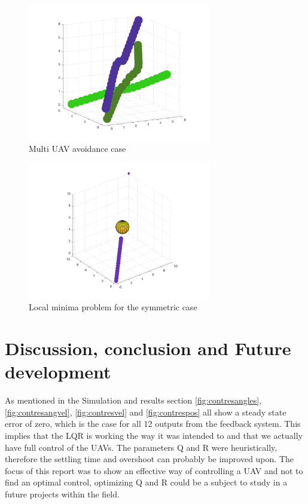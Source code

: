 \documentclass[journal]{IEEEtran}
\begin{document}
		\begin{figure}[H]
			\centering
			\includegraphics[width=8cm]{Results/Potentialfields/multi_uav_avoidance}
			\caption{Multi UAV avoidance case}
			\label{fig:multi_uav_avoidance}
		\end{figure}

		\begin{figure}[H]
			\centering
			\includegraphics[width=8cm]{Results/Potentialfields/localminima}
			\caption{Local minima problem for the symmetric case}
			\label{fig:localminima}
		\end{figure}
		
	\section{Discussion, conclusion and Future development}
	As mentioned in the Simulation and results section \figurename{\ref{fig:contresangles}}, \figurename{\ref{fig:contresangvel}}, \figurename{\ref{fig:contresvel}} and \figurename{\ref{fig:contrespos}} all show a steady state error of zero, which is the case for all 12 outputs from the feedback system. This implies that the LQR is working the way it was intended to and that we actually have full control of the UAVs. The parameters Q and R were heuristically, therefore the settling time and overshoot can probably be improved upon. The focus of this report was to show an effective way of controlling a UAV and not to find an optimal control, optimizing Q and R could be a subject to study in a  future projects within the field. \\
\end{document}
